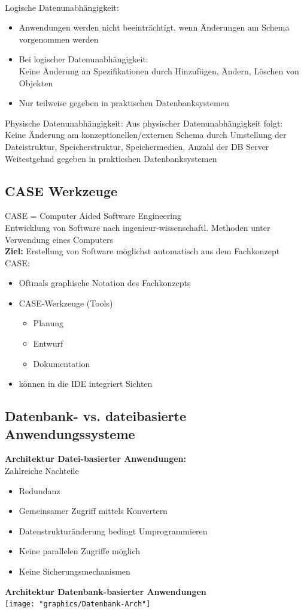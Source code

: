 \documentclass{scrreprt}
\newcommand\tab[1][1cm]{\hspace*{#1}}
\begin{document}
\\Logische Datenunabhängigkeit:
\begin{itemize}
  \item Anwendungen werden nicht beeinträchtigt, wenn Änderungen am Schema vorgenommen werden
  \item Bei logischer Datenunabhängigkeit:
  \\Keine Änderung an Spezifikationen durch Hinzufügen, Ändern, Löschen von Objekten
  \item Nur teilweise gegeben in praktischen Datenbanksystemen
\end{itemize}
Physische Datenunabhängigkeit:
\tab Aus physischer Datenunabhängigkeit folgt:
\\\tab Keine Änderung am konzeptionellen/externen Schema durch Umstellung der
Dateistruktur, Speicherstruktur, Speichermedien, Anzahl der DB Server
\\\tab Weitestgehnd gegeben in prakticshen Datenbanksystemen
\subsection{CASE Werkzeuge}
CASE = Computer Aided Software Engineering
\\Entwicklung von Software nach ingenieur-wissenschaftl. Methoden unter Verwendung eines Computers
\\\textbf{Ziel:} Erstellung von Software möglichst automatisch aus dem Fachkonzept
CASE:
\begin{itemize}
  \item Oftmals graphische Notation des Fachkonzepts
  \item CASE-Werkzeuge (Tools)
  \begin{itemize}
    \item Planung
    \item Entwurf
    \item Dokumentation
  \end{itemize}
  \item können in die IDE integriert Sichten
\end{itemize}
\subsection{Datenbank- vs. dateibasierte Anwendungssysteme}
\textbf{Architektur Datei-basierter Anwendungen:}
\\Zahlreiche Nachteile
\tab \begin{itemize}
  \item Redundanz
  \item Gemeinsamer Zugriff mittels Konvertern
  \item Datenstrukturänderung bedingt Umprogrammieren
  \item Keine parallelen Zugriffe möglich
  \item Keine Sicherungsmechanismen
\end{itemize}
\textbf{Architektur Datenbank-basierter Anwendungen}
\\\texttt{[image: "graphics/Datenbank-Arch"]}
\end{document}
